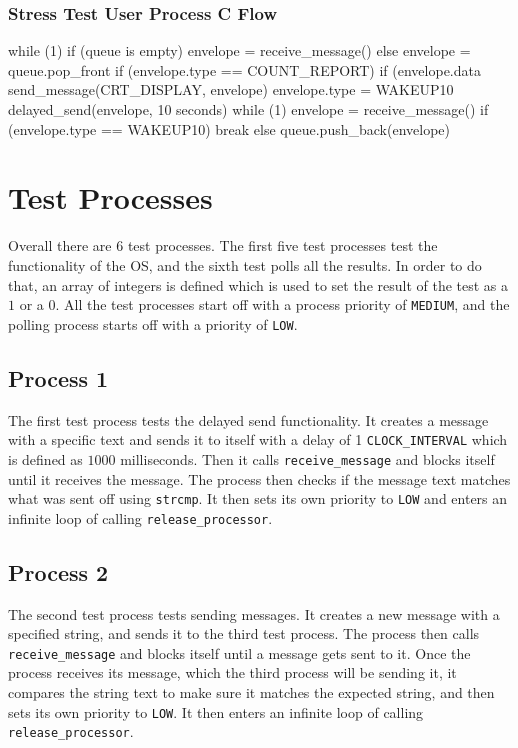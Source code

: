 \documentclass[se]{uw-wkrpt}
\begin{document}
\subsubsection{Stress Test User Process C Flow}
\begin{code}
while (1)
	if (queue is empty)
		envelope = receive_message()
	else
		envelope = queue.pop_front
	if (envelope.type == COUNT_REPORT)
		if (envelope.data %
			send_message(CRT_DISPLAY, envelope)
			envelope.type = WAKEUP10
			delayed_send(envelope, 10 seconds)
			while (1)
				envelope = receive_message()
				if (envelope.type == WAKEUP10)
					break
				else
					queue.push_back(envelope)
\end{code}


\section{Test Processes}\label{sec:testproc}

Overall there are 6 test processes. The first five test processes test the functionality of the OS, and the sixth test polls all the results. In order to do that, an array of integers is defined which is used to set the result of the test as a $1$ or a $0$. All the test processes start off with a process priority of \texttt{MEDIUM}, and the polling process starts off with a priority of \texttt{LOW}. 


\subsection{Process 1}

The first test process tests the delayed send functionality. It creates a message with a specific text and sends it to itself with a delay of 1 \texttt{CLOCK\_INTERVAL} which is defined as $1000$ milliseconds. Then it calls \texttt{receive\_message} and blocks itself until it receives the message. The process then checks if the message text matches what was sent off using \texttt{strcmp}. It then sets its own priority to \texttt{LOW} and enters an infinite loop of calling \texttt{release\_processor}. 


\subsection{Process 2}

The second test process tests sending messages. It creates a new message with a specified string, and sends it to the third test process. The process then calls \texttt{receive\_message} and blocks itself until a message gets sent to it. Once the process receives its message, which the third process will be sending it, it compares the string text to make sure it matches the expected string, and then sets its own priority to \texttt{LOW}. It then enters an infinite loop of calling \texttt{release\_processor}. 
\end{document}
